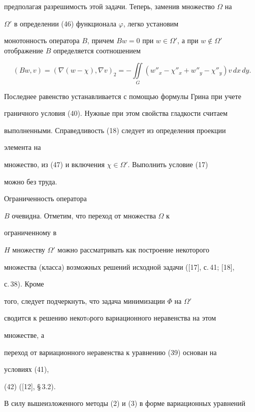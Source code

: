 предполагая разрешимость этой задачи. Теперь, заменив множество $\Omega$ на


$\Omega '$ в определении (46) функционала $\varphi $, легко установим


монотонность оператора $B$, причем $Bw=0$ при $w\in \Omega '$, а при $w


\notin \Omega'$ отображение $B$ определяется соотношением


\begin{equation}\label {47}


(Bw,v)=(\nabla (w-\chi ),\nabla v)_2=-\iint\limits_G (w''_x-


\chi ''_x+w''_y-\chi ''_y)v\,dx\,dy.


\end{equation}


Последнее равенство устанавливается с помощью формулы Грина при учете


граничного условия (40). Нужные при этом свойства гладкости считаем


выполненными. Справедливость (18) следует из определения проекции


элемента на


множество, из (47) и включения $\chi \in \Omega '$. Выполнить условие (17)


можно без труда.


Ограниченность оператора


$B$ очевидна. Отметим, что переход от множества $\Omega$ к


ограниченному в


$H$ множеству $\Omega'$ можно рассматривать как построение некоторого


множества (класса) возможных решений исходной задачи ([17], с.\,41; [18],


с.\,38). Кроме


того, следует подчеркнуть, что задача минимизации $\Phi$ на $\Omega'$


сводится к решению некотoрого вариационного неравенства на этом


множестве, а


переход от вариационного неравенства к уравнению (39) основан на


условиях (41),


(42) ([12], \S\,3.2).





В силу вышеизложенного методы (2) и (3) в форме вариационных уравнений


